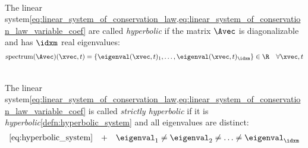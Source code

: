 \begin{defnbox}\nospacing
    \begin{defn}\label{defn:hyperbolic_system}\leavevmode\\
        The linear system\cref{eq:linear_system_of_conservation_law,eq:linear_system_of_conservation_law_variable_coef}
        are called \textit{hyperbolic} if the matrix $\Avec$ is diagonalizable and has $\idxm$ real eigenvalues:
        \begin{align}
          \text{spectrum}(\Avec)(\xvec,t)=\left\{\eigenval(\xvec,t)_{1},\ldots,\eigenval(\xvec,t)_{\idxm}\right\}\in\R&&\forall \xvec,t\label{eq:hyperbolic_system}
        \end{align}
    \end{defn}
\end{defnbox}
\begin{corbox}\nospacing
    \begin{cor}\label{cor:strictly_hyperbolic_system}\leavevmode\\
        The linear system\cref{eq:linear_system_of_conservation_law,eq:linear_system_of_conservation_law_variable_coef}
        is called \textit{strictly hyperbolic} if it is \textit{hyperbolic}\cref{defn:hyperbolic_system} and all eigenvalues are distinct:
        \begin{align}
          \cref{eq:hyperbolic_system}&&+&&\eigenval_{1}\neq\eigenval_{2}\neq\ldots\neq\eigenval_{\idxm}
        \end{align}
    \end{cor}
\end{corbox}

